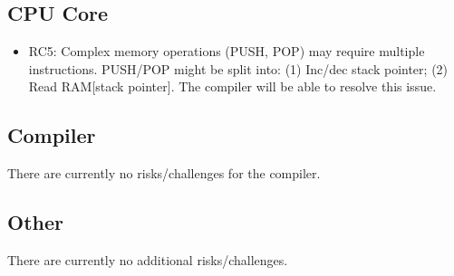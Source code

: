 \documentclass[11pt,a4paper]{article}
\begin{document}
\subsection{CPU Core}
\begin{itemize}
\item{{\color{orange} RC5: Complex memory operations (PUSH, POP) may require multiple instructions. PUSH/POP might be split into: (1) Inc/dec stack pointer; (2) Read RAM[stack pointer]. The compiler will be able to resolve this issue.}}
\end{itemize}


\subsection{Compiler}
There are currently no risks/challenges for the compiler.

\subsection{Other}
There are currently no additional risks/challenges.

\newpage
 
\end{document}
